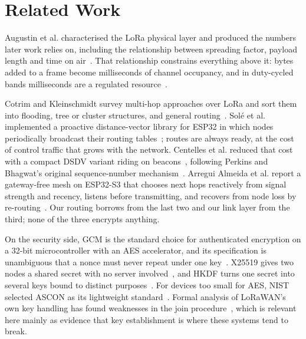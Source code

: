 \documentclass[conference]{IEEEtran}
\begin{document}
\section{Related Work}

Augustin et al. characterised the LoRa physical layer and produced the numbers
later work relies on, including the relationship between spreading factor,
payload length and time on air~\cite{augustin2016lora}. That relationship
constrains everything above it: bytes added to a frame become milliseconds of
channel occupancy, and in duty-cycled bands milliseconds are a regulated
resource~\cite{semtech2013toa}.

Cotrim and Kleinschmidt survey multi-hop approaches over LoRa and sort them into
flooding, tree or cluster structures, and general routing~\cite{cotrim2020lorawan}.
Solé et al. implemented a proactive distance-vector library for ESP32 in which
nodes periodically broadcast their routing tables~\cite{sole2022loramesher}; routes
are always ready, at the cost of control traffic that grows with the network.
Centelles et al. reduced that cost with a compact DSDV variant riding on
beacons~\cite{centelles2024dsdv}, following Perkins and Bhagwat's original
sequence-number mechanism~\cite{perkins1994dsdv}. Arregui Almeida et al. report a
gateway-free mesh on ESP32-S3 that chooses next hops reactively from signal
strength and recency, listens before transmitting, and recovers from node loss by
re-routing~\cite{arregui2025gatewayfree}. Our routing borrows from the last two and
our link layer from the third; none of the three encrypts anything.

On the security side, GCM is the standard choice for authenticated encryption on
a 32-bit microcontroller with an AES accelerator, and its specification is
unambiguous that a nonce must never repeat under one key~\cite{dworkin2007gcm}.
X25519 gives two nodes a shared secret with no server involved~\cite{rfc7748}, and
HKDF turns one secret into several keys bound to distinct
purposes~\cite{rfc5869}. For devices too small for AES, NIST selected ASCON as its
lightweight standard~\cite{nist2023ascon}. Formal analysis of LoRaWAN's own key
handling has found weaknesses in the join procedure~\cite{eldefrawy2019formal},
which is relevant here mainly as evidence that key establishment is where these
systems tend to break.

\end{document}
